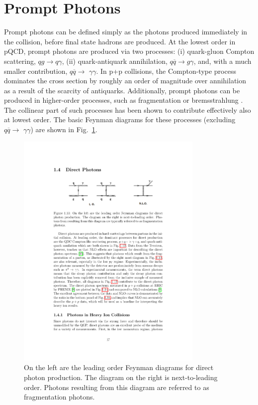 \section{Prompt Photons}
\label{sec:prompt}
Prompt photons can be defined simply as the photons produced immediately in the collision, before final state hadrons are produced. At the lowest order in pQCD, prompt photons are produced via two processes: (i) quark-gluon Compton scattering, $qg \to q\gamma$, (ii) quark-antiquark annihilation, $q\overline{q} \to g\gamma$, and, with a much smaller contribution,  $q\overline{q}\to$ $\gamma\gamma$. In p+p collisions, the Compton-type process dominates the cross section by roughly an order of magnitude over annihilation as a result of the scarcity of antiquarks. Additionally, prompt photons can be produced in higher-order processes, such as fragmentation or bremsstrahlung \cite{Aurenche1993}. The collinear part of such processes has been shown to contribute effectively also at lowest order. The basic Feynman diagrams for these processes (excluding $q\overline{q}\to$ $\gamma\gamma$) are shown in Fig.~\ref{fig:prompt_feynman}.

\begin{figure}[htpb]
  \centering
  \includegraphics[width=0.8\textwidth]{Introduction/prompt_photons.pdf}
  \caption{On the left are the leading order Feynman diagrams for direct photon production. The diagram on the right is next-to-leading order. Photons resulting from this diagram are referred to as fragmentation photons.}
  \label{fig:prompt_feynman}
\end{figure}


